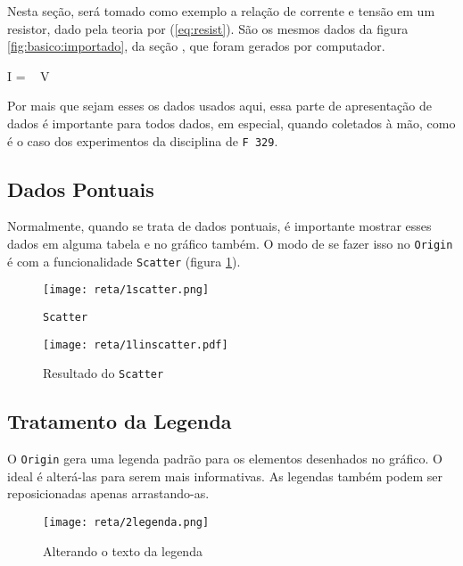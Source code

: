 Nesta seção, será tomado como exemplo a relação de corrente e tensão em um resistor, dado pela teoria por (\ref{eq:resist}). São os mesmos dados da figura \ref{fig:basico:importado}, da seção , que foram gerados por computador.

\begin{equacao} \label{eq:resist}
    I =  ~ V
\end{equacao}

Por mais que sejam esses os dados usados aqui, essa parte de apresentação de dados é importante para todos dados, em especial, quando coletados à mão, como é o caso dos experimentos da disciplina de \texttt{F 329}.


\subsection{Dados Pontuais}

    Normalmente, quando se trata de dados pontuais, é importante mostrar esses dados em alguma tabela e no gráfico também. O modo de se fazer isso no \texttt{Origin} é com a funcionalidade \texttt{Scatter} (figura \ref{fig:reta:scatter}).

    \begin{figure}[htbp]
        \centering
        \texttt{[image: reta/1scatter.png]}

        \caption{\texttt{Scatter}}
        \label{fig:reta:scatter}
    \end{figure}

    \begin{figure}[htbp]
        \centering
        \texttt{[image: reta/1linscatter.pdf]}

        \caption{Resultado do \texttt{Scatter}}
        \label{fig:reta:linscatter}
    \end{figure}


\subsection{Tratamento da Legenda}

    O \texttt{Origin} gera uma legenda padrão para os elementos desenhados no gráfico. O ideal é alterá-las para serem mais informativas. As legendas também podem ser reposicionadas apenas arrastando-as.

    \begin{figure}[htbp]
        \centering
        \texttt{[image: reta/2legenda.png]}

        \caption{Alterando o texto da legenda}
        \label{fig:reta:logenda}
    \end{figure}


